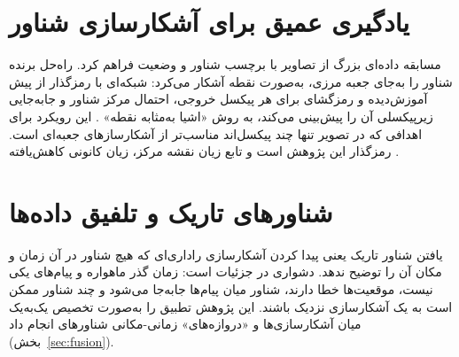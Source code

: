 \section{یادگیری عمیق برای آشکارسازی شناور}
مسابقه  \cite{paolo2022} داده‌ای بزرگ از تصاویر  با برچسب شناور و
وضعیت  فراهم کرد. راه‌حل برنده \cite{xview3first} شناور را به‌جای جعبه مرزی، به‌صورت
نقطه آشکار می‌کرد: شبکه‌ای با رمزگذار از پیش آموزش‌دیده و رمزگشای 
\cite{ronneberger2015} برای هر پیکسل خروجی، احتمال مرکز شناور و جابه‌جایی زیرپیکسلی آن را
پیش‌بینی می‌کند، به روش «اشیا به‌مثابه نقطه» \cite{zhou2019}. این رویکرد برای اهدافی که در
تصویر تنها چند پیکسل‌اند مناسب‌تر از آشکارسازهای جعبه‌ای است. رمزگذار این پژوهش
 \cite{tan2019} است و تابع زیان نقشه مرکز، زیان کانونی کاهش‌یافته
\cite{lin2017,zhou2019}.

\section{شناورهای تاریک و تلفیق داده‌ها}
یافتن شناور تاریک یعنی پیدا کردن آشکارسازی راداری‌ای که هیچ شناور  در آن زمان و
مکان آن را توضیح ندهد. دشواری در جزئیات است: زمان گذر ماهواره و پیام‌های  یکی نیست،
موقعیت‌ها خطا دارند، شناور میان پیام‌ها جابه‌جا می‌شود و چند شناور ممکن است به یک
آشکارسازی نزدیک باشند. این پژوهش تطبیق را به‌صورت تخصیص یک‌به‌یک
\cite{kuhn1955} میان آشکارسازی‌ها و «دروازه‌های» زمانی-مکانی شناورهای  انجام داد
(بخش~\ref{sec:fusion}).
